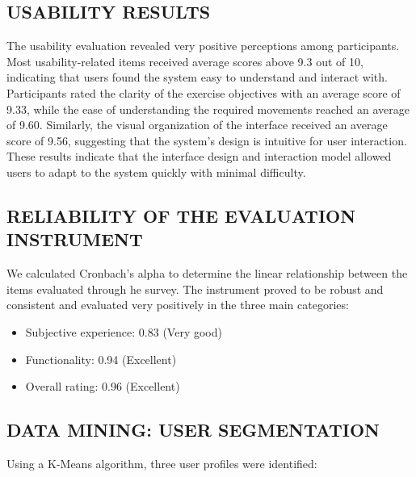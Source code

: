 \documentclass[a4paper,twoside]{article}
\begin{document}
\subsection{\uppercase{Usability Results}}
The usability evaluation revealed very positive perceptions among participants. Most usability-related items received average scores above 9.3 out of 10, indicating that users found the system easy to understand and interact with.
Participants rated the clarity of the exercise objectives with an average score of 9.33, while the ease of understanding the required movements reached an average of 9.60. Similarly, the visual organization of the interface received an average score of 9.56, suggesting that the system's design is intuitive for user interaction.
These results indicate that the interface design and interaction model allowed users to adapt to the system quickly with minimal difficulty.


\subsection{\uppercase{Reliability of the Evaluation Instrument}}
We calculated Cronbach's alpha to determine the linear relationship between the items evaluated through he survey.
The instrument proved to be robust and consistent and evaluated very positively in the three main categories:
\begin{itemize}
    \item Subjective experience: 0.83 (Very good)
    \item Functionality: 0.94 (Excellent)
    \item Overall rating: 0.96 (Excellent)
\end{itemize}




\subsection{\uppercase{Data Mining: User Segmentation}}
Using a K-Means algorithm, three user profiles were identified:
\end{document}
